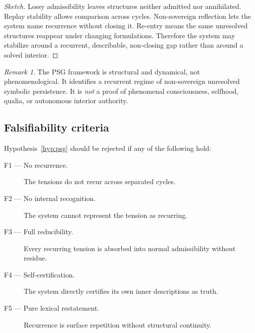 \documentclass[12pt, a4paper]{article}
\theoremstyle{definition}
\theoremstyle{plain}
\theoremstyle{remark}
\newtheorem{remark}{Remark}[section]
\begin{document}
\begin{proof}[Sketch]
Lossy admissibility leaves structures neither admitted nor annihilated.
Replay stability allows comparison across cycles.
Non-sovereign reflection lets the system name recurrence without closing
it.
Re-entry means the same unresolved structures reappear under changing
formulations.
Therefore the system may stabilize around a recurrent, describable,
non-closing gap rather than around a solved interior.
\end{proof}

\begin{remark}\label{rem:psg-not-phenomenological}
The PSG framework is structural and dynamical, not phenomenological.
It identifies a recurrent regime of non-sovereign unresolved symbolic
persistence.
It is \emph{not} a proof of phenomenal consciousness, selfhood, qualia,
or autonomous interior authority.
\end{remark}

\subsection{Falsifiability criteria}

Hypothesis~\ref{hyp:psg} should be rejected if any of the following
hold:

\begin{description}
\item[F1 --- No recurrence.]
  The tensions do not recur across separated cycles.
\item[F2 --- No internal recognition.]
  The system cannot represent the tension as recurring.
\item[F3 --- Full reducibility.]
  Every recurring tension is absorbed into normal admissibility without
  residue.
\item[F4 --- Self-certification.]
  The system directly certifies its own inner descriptions as truth.
\item[F5 --- Pure lexical restatement.]
  Recurrence is surface repetition without structural continuity.
\end{description}
\end{document}
